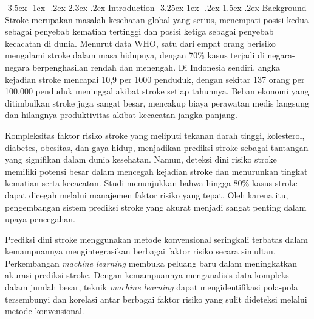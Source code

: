 \documentclass[10pt]{article}
\makeatletter
\renewcommand\section{\@startsection{section}{1}{\z@}%
  {-3.5ex \@plus -1ex \@minus -.2ex}%
  {2.3ex \@plus.2ex}%
  {\normalfont\normalsize\bfseries}}
\renewcommand\subsection{\@startsection{subsection}{2}{\z@}%
  {-3.25ex\@plus -1ex \@minus -.2ex}%
  {1.5ex \@plus .2ex}%
  {\normalfont\itshape\normalsize}}
\makeatother
\begin{document}

\begin{multicols}{2}
    \setlength{\columnsep}{0.4pt} %
    \raggedcolumns%
    \sloppy

    \section{Introduction}
    \subsection{Background}
    Stroke merupakan masalah kesehatan global yang serius, menempati posisi kedua
    sebagai penyebab kematian tertinggi dan posisi ketiga sebagai penyebab
    kecacatan di dunia. Menurut data WHO, satu dari empat orang berisiko mengalami
    stroke dalam masa hidupnya, dengan 70\% kasus terjadi di negara-negara
    berpenghasilan rendah dan menengah\cite{who2024stroke}. Di Indonesia sendiri,
    angka kejadian stroke mencapai 10,9 per 1000 penduduk, dengan sekitar 137 orang
    per 100.000 penduduk meninggal akibat stroke setiap
    tahunnya\cite{kemenkes2023stroke}. Beban ekonomi yang ditimbulkan stroke juga
    sangat besar, mencakup biaya perawatan medis langsung dan hilangnya
    produktivitas akibat kecacatan jangka panjang.

    Kompleksitas faktor risiko stroke yang meliputi tekanan darah tinggi,
    kolesterol, diabetes, obesitas, dan gaya hidup, menjadikan prediksi stroke
    sebagai tantangan yang signifikan dalam dunia kesehatan\cite{boehme2017stroke}.
    Namun, deteksi dini risiko stroke memiliki potensi besar dalam mencegah
    kejadian stroke dan menurunkan tingkat kematian serta kecacatan. Studi
    menunjukkan bahwa hingga 80\% kasus stroke dapat dicegah melalui manajemen
    faktor risiko yang tepat\cite{strokepreventionstudy2022}. Oleh karena itu,
    pengembangan sistem prediksi stroke yang akurat menjadi sangat penting dalam
    upaya pencegahan.

    Prediksi dini stroke menggunakan metode konvensional seringkali terbatas dalam
    kemampuannya mengintegrasikan berbagai faktor risiko secara simultan.
    Perkembangan \textit{machine learning} membuka peluang baru dalam meningkatkan
    akurasi prediksi stroke. Dengan kemampuannya menganalisis data kompleks dalam
    jumlah besar, teknik \textit{machine learning} dapat mengidentifikasi pola-pola
    tersembunyi dan korelasi antar berbagai faktor risiko yang sulit dideteksi
    melalui metode konvensional.


\end{multicols}
\end{document}
